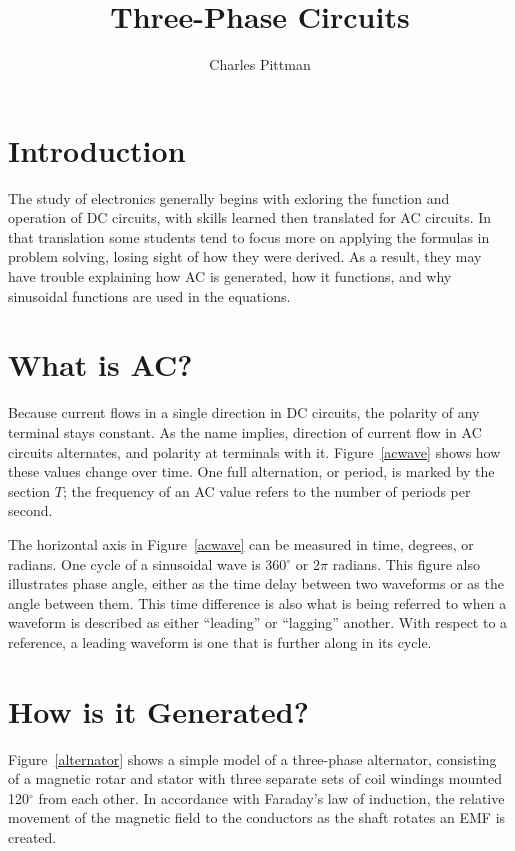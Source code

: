 \documentclass{article}
\author{Charles Pittman}
\title{Three-Phase Circuits}
\begin{document}
  \maketitle

  \section{Introduction}
  The study of electronics generally begins with exloring the function and
  operation of \ac{DC} circuits, with skills learned then translated for
  \ac{AC} circuits.  In that translation some students tend to focus more on
  applying the formulas in problem solving, losing sight of how they were
  derived.  As a result, they may have trouble explaining how \ac{AC} is
  generated, how it functions, and  why sinusoidal functions are used in the
  equations.

  \section{What is \ac{AC}?}
  Because current flows in a single direction in \ac{DC} circuits, the polarity
  of any terminal stays constant.  As the name implies, direction of current
  flow in \ac{AC} circuits alternates, and polarity at terminals with it.
  Figure~\ref{acwave} shows how these values change over time.  One full
  alternation, or period, is marked by the section $T$; the frequency of an
  \ac{AC} value refers to the number of periods per second.

  The horizontal axis in Figure~\ref{acwave} can be measured in time, degrees,
  or radians.  One cycle of a sinusoidal wave is 360$^\circ$ or 2$\pi$ radians.
  This figure also illustrates phase angle, either as the time delay between
  two waveforms or as the angle between them.  This time difference is also
  what is being referred to when a waveform is described as either ``leading''
  or ``lagging'' another.  With respect to a reference, a leading waveform is
  one that is further along in its cycle.

  \section{How is it Generated?}
  Figure~\ref{alternator} shows a simple model of a three-phase alternator,
  consisting of a magnetic rotar and stator with three separate sets of coil
  windings mounted 120$^\circ$ from each other.  In accordance with Faraday's
  law of induction, the relative movement of the magnetic field to the
  conductors as the shaft rotates an \ac{EMF} is created.
\end{document}
